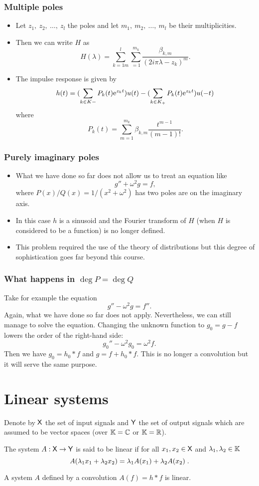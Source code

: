 \begin{frame}
\frametitle{Multiple poles}
\begin{itemize}
\item Let $z_{1},\ z_{2},\ \ldots,\ z_{l}$ the poles and let $m_{1},\ m_{2},\ \ldots,\ m_{l}$ be their multiplicities. 
\item Then we can write $H$ as
$$
H(\lambda)=\sum_{k=1m}^{l}\sum_{=1}^{m_{k}}\frac{\beta_{k,m}}{(2i\pi\lambda-z_{k})^{m}}.
$$
\item The impulse response is given by 
$$
h(t)=(\displaystyle \sum_{k\in K-}P_{k}(t) \mathrm{e}^{z_{k}t})u(t)-(\sum_{k\in K_{+}}P_{k}(t) \mathrm{e}^{z_{k}t})u(-t)
$$
where
$$
P_{k}(t)=\sum_{m=1}^{m_{k}}\beta_{k,m} \frac{t^{m-1}}{(m-1)!}.
$$
\end{itemize}
\end{frame}

\begin{frame}
\frametitle{Purely imaginary poles}
\begin{itemize}
\item What we have done so far does not allow us to treat an equation like
$$
g''+\omega^{2}g=f,
$$
where $P(x)/Q(x)=1/(x^{2}+\omega^{2})$ has two poles are on the imaginary axis. 
\item In this case $h$ is a sinusoid and the Fourier transform of $H$ (when $H$ is considered to be a function) is no longer defined. 
\item This problem required the use of the \alert{theory of  distributions} but this degree of sophistication goes far beyond this course.
\end{itemize}
\end{frame}

\begin{frame}
\frametitle{What happens in $\deg P= \deg Q$}
Take for example the equation
$$
g''-\omega^{2}g=f''.
$$
Again, what we have done so far does not apply. Nevertheless, we can still manage to solve the equation. 
Changing the unknown function to $g_0 =g-f$ lowers the order of the right-hand side:
$$
g_{0}''-\omega^{2}g_{0}=\omega^{2}f.
$$
Then we have $g_{0}=h_{0}*f$ and $g=f+h_{0}*f$. 
This is \alert{no longer a convolution}  but it will serve the same purpose.
\end{frame}

\section{Linear systems}
\begin{frame}
Denote by $\mathsf{X}$ the set of \alert{input signals} and $\mathsf{Y}$ the set of \alert{output signals} which are assumed to be vector 
spaces (over $\mathbb{K}=\mathbb{C}$ or $\mathbb{K}=\mathbb{R}$).
\begin{definition}[Linearity]
The system $A: \mathsf{X} \to \mathsf{Y}$ is said to be \alert{linear} if for all $x_1,x_2 \in \mathsf{X}$ and $\lambda_1,\lambda_2 \in \mathbb{K}$
$$
A(\lambda_1 x_1 + \lambda_2 x_2)= \lambda_1 A(x_1) + \lambda_2 A(x_2) \;.
$$
\end{definition}
A system $A$ defined by a convolution $A(f) = h * f$ is linear.  
\end{frame}

